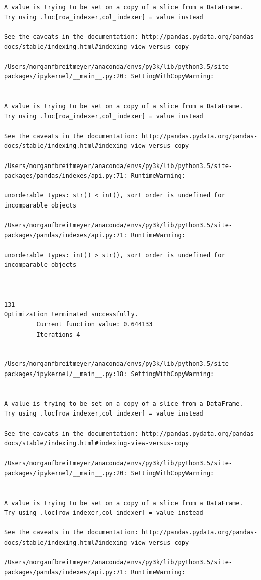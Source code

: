 \begin{lstlisting}
A value is trying to be set on a copy of a slice from a DataFrame.
Try using .loc[row_indexer,col_indexer] = value instead

See the caveats in the documentation: http://pandas.pydata.org/pandas-docs/stable/indexing.html#indexing-view-versus-copy

/Users/morganfbreitmeyer/anaconda/envs/py3k/lib/python3.5/site-packages/ipykernel/__main__.py:20: SettingWithCopyWarning:


A value is trying to be set on a copy of a slice from a DataFrame.
Try using .loc[row_indexer,col_indexer] = value instead

See the caveats in the documentation: http://pandas.pydata.org/pandas-docs/stable/indexing.html#indexing-view-versus-copy

/Users/morganfbreitmeyer/anaconda/envs/py3k/lib/python3.5/site-packages/pandas/indexes/api.py:71: RuntimeWarning:

unorderable types: str() < int(), sort order is undefined for incomparable objects

/Users/morganfbreitmeyer/anaconda/envs/py3k/lib/python3.5/site-packages/pandas/indexes/api.py:71: RuntimeWarning:

unorderable types: int() > str(), sort order is undefined for incomparable objects



131
Optimization terminated successfully.
         Current function value: 0.644133
         Iterations 4


/Users/morganfbreitmeyer/anaconda/envs/py3k/lib/python3.5/site-packages/ipykernel/__main__.py:18: SettingWithCopyWarning:


A value is trying to be set on a copy of a slice from a DataFrame.
Try using .loc[row_indexer,col_indexer] = value instead

See the caveats in the documentation: http://pandas.pydata.org/pandas-docs/stable/indexing.html#indexing-view-versus-copy

/Users/morganfbreitmeyer/anaconda/envs/py3k/lib/python3.5/site-packages/ipykernel/__main__.py:20: SettingWithCopyWarning:


A value is trying to be set on a copy of a slice from a DataFrame.
Try using .loc[row_indexer,col_indexer] = value instead

See the caveats in the documentation: http://pandas.pydata.org/pandas-docs/stable/indexing.html#indexing-view-versus-copy

/Users/morganfbreitmeyer/anaconda/envs/py3k/lib/python3.5/site-packages/pandas/indexes/api.py:71: RuntimeWarning:


\end{lstlisting}
